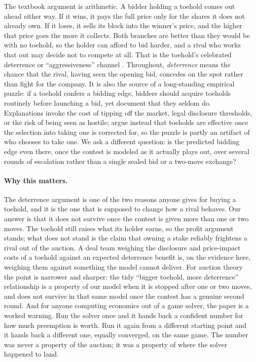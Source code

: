 \documentclass[11pt,a4paper]{article}
\begin{document}
The textbook argument is arithmetic. A bidder holding a toehold comes out ahead either way. If it wins, it pays the full price only for the shares it does not already own. If it loses, it sells its block into the winner's price, and the higher that price goes the more it collects. Both branches are better than they would be with no toehold, so the holder can afford to bid harder, and a rival who works that out may decide not to compete at all. That is the toehold's celebrated deterrence or ``aggressiveness'' channel \citep{bulow1999,fishman1988}. Throughout, \emph{deterrence} means the chance that the rival, having seen the opening bid, concedes on the spot rather than fight for the company. It is also the source of a long-standing empirical puzzle: if a toehold confers a bidding edge, bidders should acquire toeholds routinely before launching a bid, yet \citet{bettoneckbothorburn2009} document that they seldom do. Explanations invoke the cost of tipping off the market, legal disclosure thresholds, or the risk of being seen as hostile; \citet{daigryglewiczsmit2021} argue instead that toeholds are effective once the selection into taking one is corrected for, so the puzzle is partly an artifact of who chooses to take one. We ask a different question: is the predicted bidding edge even there, once the contest is modeled as it actually plays out, over several rounds of escalation rather than a single sealed bid or a two-move exchange?

\paragraph{Why this matters.} The deterrence argument is one of the two reasons anyone gives for buying a toehold, and it is the one that is supposed to change how a rival behaves. Our answer is that it does not survive once the contest is given more than one or two moves. The toehold still raises what its holder earns, so the profit argument stands; what does not stand is the claim that owning a stake reliably frightens a rival out of the auction. A deal team weighing the disclosure and price-impact costs of a toehold against an expected deterrence benefit is, on the evidence here, weighing them against something the model cannot deliver. For auction theory the point is narrower and sharper: the tidy ``bigger toehold, more deterrence'' relationship is a property of our model when it is stopped after one or two moves, and does not survive in that same model once the contest has a genuine second round. And for anyone computing economics out of a game solver, the paper is a worked warning. Run the solver once and it hands back a confident number for how much preemption is worth. Run it again from a different starting point and it hands back a different one, equally converged, on the same game. The number was never a property of the auction; it was a property of where the solver happened to land.
\end{document}
